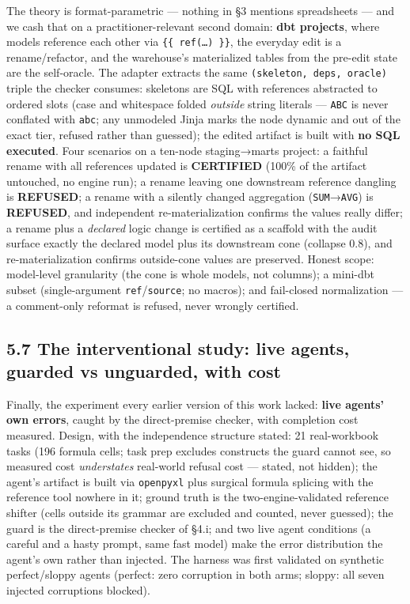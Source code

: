 \documentclass[
  11pt,
]{article}
\begin{document}
The theory is format-parametric --- nothing in §3 mentions spreadsheets
--- and we cash that on a practitioner-relevant second domain:
\textbf{dbt projects}, where models reference each other via
\texttt{\{\{\ ref(…)\ \}\}}, the everyday edit is a rename/refactor, and
the warehouse's materialized tables from the pre-edit state are the
self-oracle. The adapter extracts the same
\texttt{(skeleton,\ deps,\ oracle)} triple the checker consumes:
skeletons are SQL with references abstracted to ordered slots (case and
whitespace folded \emph{outside} string literals ---
\texttt{\textquotesingle{}ABC\textquotesingle{}} is never conflated with
\texttt{\textquotesingle{}abc\textquotesingle{}}; any unmodeled Jinja
marks the node dynamic and out of the exact tier, refused rather than
guessed); the edited artifact is built with \textbf{no SQL executed}.
Four scenarios on a ten-node staging→marts project: a faithful rename
with all references updated is \textbf{CERTIFIED} (100\% of the artifact
untouched, no engine run); a rename leaving one downstream reference
dangling is \textbf{REFUSED}; a rename with a silently changed
aggregation (\texttt{SUM}→\texttt{AVG}) is \textbf{REFUSED}, and
independent re-materialization confirms the values really differ; a
rename plus a \emph{declared} logic change is certified as a scaffold
with the audit surface exactly the declared model plus its downstream
cone (collapse 0.8), and re-materialization confirms outside-cone values
are preserved. Honest scope: model-level granularity (the cone is whole
models, not columns); a mini-dbt subset (single-argument
\texttt{ref}/\texttt{source}; no macros); and fail-closed normalization
--- a comment-only reformat is refused, never wrongly certified.

\subsection{5.7 The interventional study: live agents, guarded vs
unguarded, with
cost}\label{the-interventional-study-live-agents-guarded-vs-unguarded-with-cost}

Finally, the experiment every earlier version of this work lacked:
\textbf{live agents' own errors}, caught by the direct-premise checker,
with completion cost measured. Design, with the independence structure
stated: 21 real-workbook tasks (196 formula cells; task prep excludes
constructs the guard cannot see, so measured cost \emph{understates}
real-world refusal cost --- stated, not hidden); the agent's artifact is
built via \texttt{openpyxl} plus surgical formula splicing with the
reference tool nowhere in it; ground truth is the two-engine-validated
reference shifter (cells outside its grammar are excluded and counted,
never guessed); the guard is the direct-premise checker of §4.i; and two
live agent conditions (a careful and a hasty prompt, same fast model)
make the error distribution the agent's own rather than injected. The
harness was first validated on synthetic perfect/sloppy agents (perfect:
zero corruption in both arms; sloppy: all seven injected corruptions
blocked).
\end{document}
